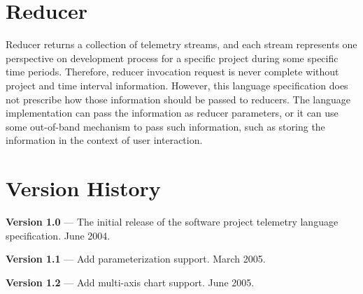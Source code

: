  
 

\section{Reducer}

Reducer returns a collection of telemetry streams, and each stream represents one perspective on development process for a specific project during some specific time periods. Therefore, reducer invocation request is never complete without project and time interval information. However, this language specification does not prescribe how those information should be passed to reducers. The language implementation can pass the information as reducer parameters, or it can use some out-of-band mechanism to pass such information, such as storing the information in the context of user interaction.





\section{Version History}

\textbf{Version 1.0} --- The initial release of the software project telemetry language specification. June 2004.

\textbf{Version 1.1} --- Add parameterization support. March 2005.

\textbf{Version 1.2} --- Add multi-axis chart support. June 2005.